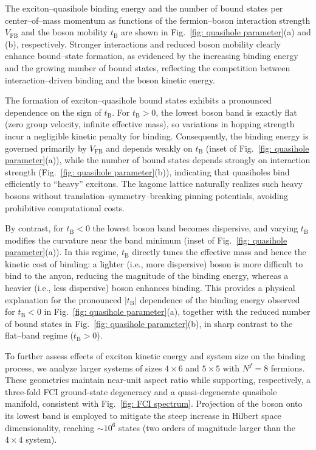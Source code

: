 \documentclass[aps,prl,twocolumn,amsmath,amssymb,nofootinbib,superscriptaddress,floatfix]{revtex4-1}
\begin{document}
{The exciton--quasihole binding energy and {the number of bound states per center--of--mass momentum} as functions of the fermion--boson interaction strength $V_{\textrm{FB}}$ and the boson mobility $t_{\textrm{B}}$ are shown in Fig.~\ref{fig: quasihole parameter}(a) and (b), respectively. Stronger interactions and reduced boson mobility clearly enhance bound--state formation, as evidenced by the increasing binding energy and the growing number of bound states, reflecting the competition between interaction--driven binding and the boson kinetic energy.

}

{
{
The formation of exciton--quasihole bound states exhibits a pronounced dependence on the sign of $t_{\text{B}}$. For $t_{\text{B}}>0$, the lowest boson band is exactly flat (zero group velocity, infinite effective mass), so variations in hopping strength incur a negligible kinetic penalty for binding. Consequently, the binding energy is governed primarily by $V_{\text{FB}}$ and depends weakly on $t_{\text{B}}$ (inset of Fig.~\ref{fig: quasihole parameter}(a)), while the number of bound states depends strongly on interaction strength (Fig.~\ref{fig: quasihole parameter}(b)), indicating that quasiholes bind efficiently to ``heavy'' excitons. The kagome lattice naturally realizes such heavy bosons without translation--symmetry--breaking pinning potentials, avoiding prohibitive computational costs.
}



{By contrast, for $t_{\text{B}}<0$ the lowest boson band becomes dispersive, and varying $t_{\text{B}}$ modifies the curvature near the band minimum (inset of Fig.~\ref{fig: quasihole parameter}(a)). In this regime, $t_{\text{B}}$ directly tunes the effective mass and hence the kinetic cost of binding: a lighter (i.e., more dispersive) boson is more difficult to bind to the anyon, reducing the magnitude of the binding energy, whereas a heavier (i.e., less dispersive) boson enhances binding. This provides a physical explanation for the pronounced $|t_{\text{B}}|$ dependence of the binding energy observed for $t_{\text{B}}<0$ in Fig.~\ref{fig: quasihole parameter}(a), together with the reduced number of bound states in Fig.~\ref{fig: quasihole parameter}(b), in sharp contrast to the flat--band regime ($t_{\text{B}}>0$).}

{To further assess effects of exciton kinetic energy and system size on the binding process, we analyze larger systems of sizes $4 \times 6$ and $5 \times 5$ with $N^{f}=8$ fermions. These geometries maintain near-unit aspect ratio while supporting, respectively, a three-fold FCI ground-state degeneracy and a quasi-degenerate quasihole manifold, consistent with Fig.~\ref{fig: FCI spectrum}. Projection of the boson onto its lowest band is employed to mitigate the steep increase in Hilbert space dimensionality, reaching $\sim 10^6$ states (two orders of magnitude larger than the $4 \times 4$ system).

}}
\end{document}
